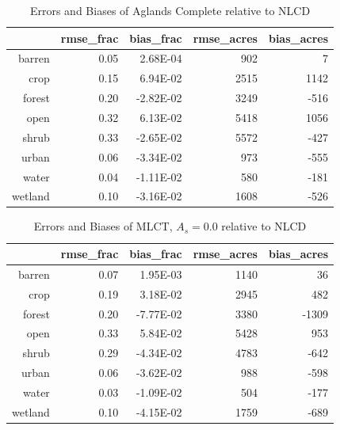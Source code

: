 \begin{table}[ht]
\begin{center}
\begin{tabular}{rrrrr}
  \hline
 & rmse\_frac & bias\_frac & rmse\_acres & bias\_acres \\ 
  \hline
barren & 0.05 & 2.68E-04 & 902 & 7 \\ 
  crop & 0.15 & 6.94E-02 & 2515 & 1142 \\ 
  forest & 0.20 & -2.82E-02 & 3249 & -516 \\ 
  open & 0.32 & 6.13E-02 & 5418 & 1056 \\ 
  shrub & 0.33 & -2.65E-02 & 5572 & -427 \\ 
  urban & 0.06 & -3.34E-02 & 973 & -555 \\ 
  water & 0.04 & -1.11E-02 & 580 & -181 \\ 
  wetland & 0.10 & -3.16E-02 & 1608 & -526 \\ 
   \hline
\end{tabular}
\caption{Errors and Biases of Aglands Complete relative to NLCD}
\label{tab:ebagc}
\end{center}
\end{table}%
\begin{table}[ht]
\begin{center}
\begin{tabular}{rrrrr}
  \hline
 & rmse\_frac & bias\_frac & rmse\_acres & bias\_acres \\ 
  \hline
barren & 0.07 & 1.95E-03 & 1140 & 36 \\ 
  crop & 0.19 & 3.18E-02 & 2945 & 482 \\ 
  forest & 0.20 & -7.77E-02 & 3380 & -1309 \\ 
  open & 0.33 & 5.84E-02 & 5428 & 953 \\ 
  shrub & 0.29 & -4.34E-02 & 4783 & -642 \\ 
  urban & 0.06 & -3.62E-02 & 988 & -598 \\ 
  water & 0.03 & -1.09E-02 & 504 & -177 \\ 
  wetland & 0.10 & -4.15E-02 & 1759 & -689 \\ 
   \hline
\end{tabular}
\caption{Errors and Biases of MLCT, $A_s = 0.0$ relative to NLCD}
\label{tab:ebmlct00}
\end{center}
\end{table}%
